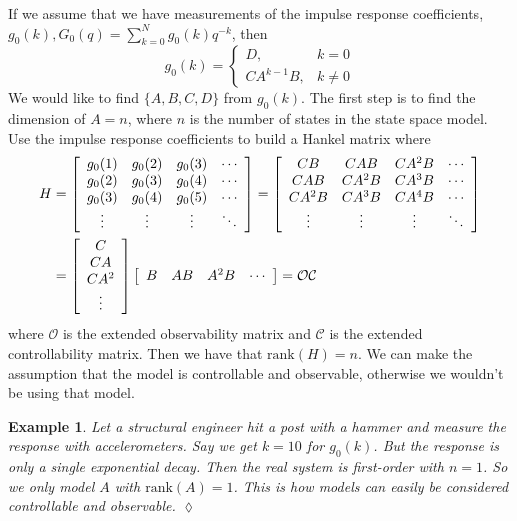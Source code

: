 \documentclass[lecture,12pt,]{pcms-l}
\theoremstyle{example}
\newtheorem{example}{Example}[section]
\newcommand{\sumk}{\sum_{k=0}^N}
\begin{document}
If we assume that we have measurements of the impulse response coefficients, $g_0(k), G_0(q)=\sumk g_0(k)q^{-k}$, then
$$g_0(k) = \begin{cases} D, & k=0 \\ CA^{k-1}B, & k\neq0 \end{cases}$$
We would like to find $\{A,B,C,D\}$ from $g_0(k)$. The first step is to find the dimension of $A=n$, where $n$ is the number of states in the state space model. Use the impulse response coefficients to build a Hankel matrix where
\begin{align*}
H &= \left[\begin{array}{c c c c} g_0(1) & g_0(2) & g_0(3) & \cdots \\ g_0(2) & g_0(3) & g_0(4) & \cdots \\ g_0(3) & g_0(4) & g_0(5) & \cdots \\ \vdots & \vdots & \vdots & \ddots \end{array}\right]
= \left[\begin{array}{c c c c} CB & CAB & CA^2B & \cdots \\ CAB & CA^2B & CA^3B & \cdots \\ CA^2B & CA^3B & CA^4B & \cdots \\ \vdots & \vdots & \vdots & \ddots \end{array}\right] \\
&= \left[\begin{array}{c} C \\ CA \\ CA^2 \\ \vdots \end{array}\right] \left[\begin{array}{c c c c} B & AB & A^2B & \cdots \end{array}\right] = \mathcal{O}\mathcal{C}
\end{align*}
where $\mathcal{O}$ is the extended observability matrix and $\mathcal{C}$ is the extended controllability matrix. Then we have that $\text{rank}(H)=n$. We can make the assumption that the model is controllable and observable, otherwise we wouldn't be using that model.

\begin{example}
Let a structural engineer hit a post with a hammer and measure the response with accelerometers. Say we get $k=10$ for $g_0(k)$. But the response is only a single exponential decay. Then the real system is first-order with $n=1$. So we only model $A$ with $\text{rank}(A)=1$. This is how models can easily be considered controllable and observable.
$\lozenge$
\end{example}
\end{document}

